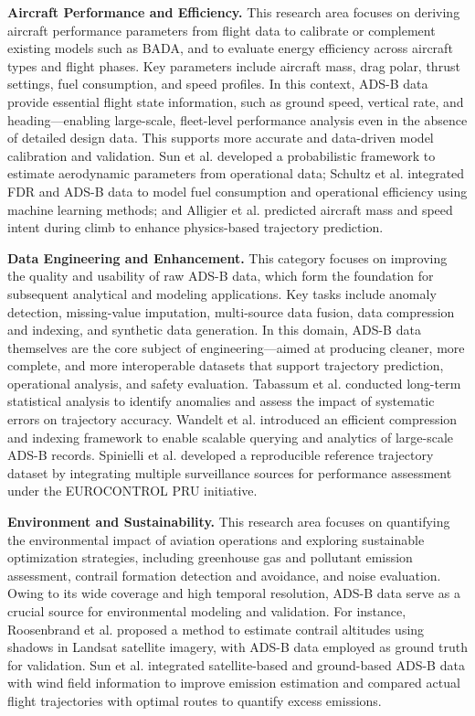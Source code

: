 \textbf{Aircraft Performance and Efficiency.} 
This research area focuses on deriving aircraft performance parameters from flight data to calibrate or complement existing models such as BADA, and to evaluate energy efficiency across aircraft types and flight phases. Key parameters include aircraft mass, drag polar, thrust settings, fuel consumption, and speed profiles.
In this context, ADS-B data provide essential flight state information, such as ground speed, vertical rate, and heading—enabling large-scale, fleet-level performance analysis even in the absence of detailed design data. This supports more accurate and data-driven model calibration and validation.
Sun et al. \cite{sun2018aircraft} developed a probabilistic framework to estimate aerodynamic parameters from operational data; Schultz et al. \cite{schultz2022data} integrated FDR and ADS-B data to model fuel consumption and operational efficiency using machine learning methods; and Alligier et al. \cite{alligier2020predictive} predicted aircraft mass and speed intent during climb to enhance physics-based trajectory prediction.

\textbf{Data Engineering and Enhancement.} 
This category focuses on improving the quality and usability of raw ADS-B data, which form the foundation for subsequent analytical and modeling applications. Key tasks include anomaly detection, missing-value imputation, multi-source data fusion, data compression and indexing, and synthetic data generation. In this domain, ADS-B data themselves are the core subject of engineering—aimed at producing cleaner, more complete, and more interoperable datasets that support trajectory prediction, operational analysis, and safety evaluation.
Tabassum et al. \cite{tabassum2017ads} conducted long-term statistical analysis to identify anomalies and assess the impact of systematic errors on trajectory accuracy. Wandelt et al. \cite{wandelt2018ads} introduced an efficient compression and indexing framework to enable scalable querying and analytics of large-scale ADS-B records. Spinielli et al. \cite{spinielli2017initial} developed a reproducible reference trajectory dataset by integrating multiple surveillance sources for performance assessment under the EUROCONTROL PRU initiative.

\textbf{Environment and Sustainability.}
This research area focuses on quantifying the environmental impact of aviation operations and exploring sustainable optimization strategies, including greenhouse gas and pollutant emission assessment, contrail formation detection and avoidance, and noise evaluation. Owing to its wide coverage and high temporal resolution, ADS-B data serve as a crucial source for environmental modeling and validation. For instance, Roosenbrand et al. \cite{roosenbrand2023contrail} proposed a method to estimate contrail altitudes using shadows in Landsat satellite imagery, with ADS-B data employed as ground truth for validation. Sun et al. \cite{sun2023evaluating} integrated satellite-based and ground-based ADS-B data with wind field information to improve emission estimation and compared actual flight trajectories with optimal routes to quantify excess emissions.

